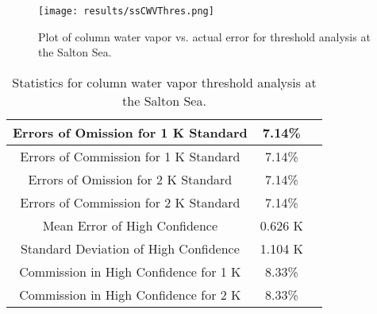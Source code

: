 \documentclass{book}
\begin{document}
\begin{minipage}[c]{0.47\textwidth}
\centering
\begin{figure}[H]
\texttt{[image: results/ssCWVThres.png]}
\caption{Plot of column water vapor vs. actual error for threshold analysis at the Salton Sea.}
\label{fig:ssCWVThres}
\end{figure}
\end{minipage}
\begin{minipage}[c]{0.47\textwidth}
\begin{table}[H]
\centering
\footnotesize
\begin{tabular}{ | c | c | c | } \hline
Errors of Omission for 1 K Standard & 7.14\% \\ \hline
Errors of Commission for 1 K Standard & 7.14\% \\ \hline
Errors of Omission for 2 K Standard & 7.14\% \\ \hline
Errors of Commission for 2 K Standard & 7.14\% \\ \hline
Mean Error of High Confidence & 0.626 K \\ \hline
Standard Deviation of High Confidence & 1.104 K \\ \hline
Commission in High Confidence for 1 K & 8.33\% \\ \hline
Commission in High Confidence for 2 K & 8.33\% \\ \hline
\end{tabular}
\caption{Statistics for column water vapor threshold analysis at the Salton Sea.}
\label{tab:ssCWVThres}
\end{table}
\end{minipage}
\end{document}
